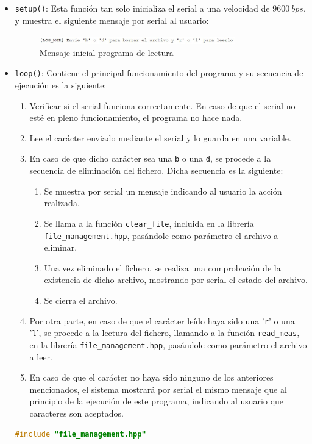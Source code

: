 \begin{itemize}
    \item \texttt{setup()}: Esta función tan solo inicializa el serial a una velocidad de $9600\ bps$, y muestra el siguiente mensaje por serial al usuario:
    \begin{figure}[H]
        \centering
        \includegraphics[width=0.8\textwidth]{images/3-software/3-4-readfile/MensajeInicial.png}
        \caption{Mensaje inicial programa de lectura}
        \label{fig:3-4-1-MensajeInicial}
    \end{figure}
    \item \texttt{loop()}: Contiene el principal funcionamiento del programa y su secuencia de ejecución es la siguiente:
    \begin{enumerate}
        \item Verificar si el serial funciona correctamente. En caso de que el serial no esté en pleno funcionamiento, el programa no hace nada.
        \item Lee el carácter enviado mediante el serial y lo guarda en una variable.
        \item En caso de que dicho carácter sea una \texttt{b} o una \texttt{d}, se procede a la secuencia de eliminación del fichero. Dicha secuencia es la siguiente:
        \begin{enumerate}
            \item Se muestra por serial un mensaje indicando al usuario la acción realizada.
            \item Se llama a la función \texttt{clear\_file}, incluida en la librería \texttt{file\_management.hpp}, pasándole como parámetro el archivo a eliminar.
            \item Una vez eliminado el fichero, se realiza una comprobación de la existencia de dicho archivo, mostrando por serial el estado del archivo.
            \item Se cierra el archivo.
        \end{enumerate}
        \item Por otra parte, en caso de que el carácter leído haya sido una '\texttt{r}' o una '\texttt{l}', se procede a la lectura del fichero, llamando a la función \texttt{read\_meas}, en la librería \texttt{file\_management.hpp}, pasándole como parámetro el archivo a leer.
        \item En caso de que el carácter no haya sido ninguno de los anteriores mencionados, el sistema mostrará por serial el mismo mensaje que al principio de la ejecución de este programa, indicando al usuario que caracteres son aceptados.
    \end{enumerate}
    \begin{lstlisting}[captionpos=b, caption={Programa lectura o eliminación de fichero}, language=c++]
#include "file_management.hpp"


\end{lstlisting}
\end{itemize}
